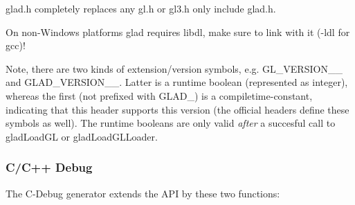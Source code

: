 {\ttfamily glad.\+h} completely replaces any {\ttfamily gl.\+h} or {\ttfamily gl3.\+h} only include {\ttfamily glad.\+h}.




On non-\/\+Windows platforms glad requires {\ttfamily libdl}, make sure to link with it ({\ttfamily -\/ldl} for gcc)!

Note, there are two kinds of extension/version symbols, e.\+g. {\ttfamily G\+L\+\_\+\+V\+E\+R\+S\+I\+O\+N\+\_\+\_} and {\ttfamily G\+L\+A\+D\+\_\+\+V\+E\+R\+S\+I\+O\+N\+\_\+\_}. Latter is a runtime boolean (represented as integer), whereas the first (not prefixed with {\ttfamily G\+L\+A\+D\+\_\+}) is a compiletime-\/constant, indicating that this header supports this version (the official headers define these symbols as well). The runtime booleans are only valid {\itshape after} a succesful call to {\ttfamily glad\+Load\+GL} or {\ttfamily glad\+Load\+G\+L\+Loader}.

\subsubsection*{C/\+C++ Debug}

The C-\/\+Debug generator extends the A\+PI by these two functions\+:


